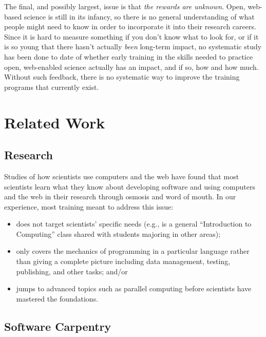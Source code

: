 \documentclass[11pt]{article}
\begin{document}
The final, and possibly largest, issue is that \emph{the rewards are
  unknown}.  Open, web-based science is still in its infancy, so there
is no general understanding of what people might need to know in order
to incorporate it into their research careers.  Since it is hard to
measure something if you don't know what to look for, or if it is so
young that there hasn't actually \emph{been} long-term impact, no
systematic study has been done to date of whether early training in
the skills needed to practice open, web-enabled science actually has
an impact, and if so, how and how much.  Without such feedback, there
is no systematic way to improve the training programs that currently
exist.

\section{Related Work}

\subsection{Research}

Studies of how scientists use computers and the web have found that
most scientists learn what they know about developing software and
using computers and the web in their research through osmosis and word
of mouth. In our experience, most training meant to address this issue:

\begin{itemize}

\item
  does not target scientists' specific needs (e.g., is a general
  ``Introduction to Computing'' class shared with students majoring in
  other areas);

\item
  only covers the mechanics of programming in a particular language
  rather than giving a complete picture including data management,
  testing, publishing, and other tasks; and/or

\item
  jumps to advanced topics such as parallel computing before
  scientists have mastered the foundations.

\end{itemize}

\subsection{Software Carpentry}
\end{document}
